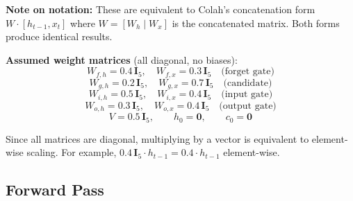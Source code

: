 \textbf{Note on notation:} These are equivalent to Colah's concatenation form
$W \cdot [h_{t-1}, x_t]$ where $W = [W_h \mid W_x]$ is the concatenated matrix.
Both forms produce identical results.

\textbf{Assumed weight matrices} (all diagonal, no biases):
\begin{equation}
    W_{f,h} = 0.4\,\mathbf{I}_5, \quad W_{f,x} = 0.3\,\mathbf{I}_5 \quad \text{(forget gate)}
\end{equation}
\begin{equation}
    W_{g,h} = 0.2\,\mathbf{I}_5, \quad W_{g,x} = 0.7\,\mathbf{I}_5 \quad \text{(candidate)}
\end{equation}
\begin{equation}
    W_{i,h} = 0.5\,\mathbf{I}_5, \quad W_{i,x} = 0.4\,\mathbf{I}_5 \quad \text{(input gate)}
\end{equation}
\begin{equation}
    W_{o,h} = 0.3\,\mathbf{I}_5, \quad W_{o,x} = 0.4\,\mathbf{I}_5 \quad \text{(output gate)}
\end{equation}
\begin{equation}
    V = 0.5\,\mathbf{I}_5, \qquad h_0 = \mathbf{0}, \qquad c_0 = \mathbf{0}
\end{equation}

Since all matrices are diagonal, multiplying by a vector is equivalent to element-wise
scaling. For example, $0.4\,\mathbf{I}_5 \cdot h_{t-1} = 0.4 \cdot h_{t-1}$ element-wise.

\subsection{Forward Pass}


